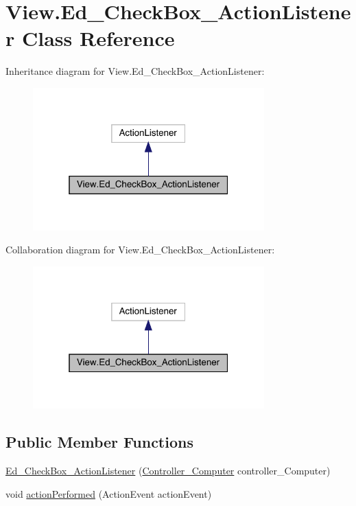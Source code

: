 \hypertarget{class_view_1_1_ed___check_box___action_listener}{}\section{View.\+Ed\+\_\+\+Check\+Box\+\_\+\+Action\+Listener Class Reference}
\label{class_view_1_1_ed___check_box___action_listener}


Inheritance diagram for View.\+Ed\+\_\+\+Check\+Box\+\_\+\+Action\+Listener\+:
\nopagebreak
\begin{figure}[H]
\begin{center}
\leavevmode
\includegraphics[width=253pt]{class_view_1_1_ed___check_box___action_listener__inherit__graph}
\end{center}
\end{figure}


Collaboration diagram for View.\+Ed\+\_\+\+Check\+Box\+\_\+\+Action\+Listener\+:
\nopagebreak
\begin{figure}[H]
\begin{center}
\leavevmode
\includegraphics[width=253pt]{class_view_1_1_ed___check_box___action_listener__coll__graph}
\end{center}
\end{figure}
\subsection*{Public Member Functions}
\begin{DoxyCompactItemize}
\item 
\hyperlink{class_view_1_1_ed___check_box___action_listener_aa67f101f5022f6c4e9e596cbcb106903}{Ed\+\_\+\+Check\+Box\+\_\+\+Action\+Listener} (\hyperlink{class_controller_1_1_controller___computer}{Controller\+\_\+\+Computer} controller\+\_\+\+Computer)
\item 
void \hyperlink{class_view_1_1_ed___check_box___action_listener_af33430df078ede5ecefcb8b700245737}{action\+Performed} (Action\+Event action\+Event)
\end{DoxyCompactItemize}


